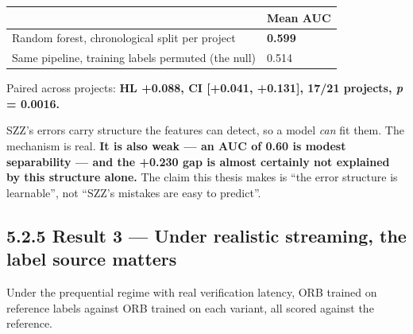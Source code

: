 \begin{longtable}[]{@{}ll@{}}
\toprule\noalign{}
& Mean AUC \\
\midrule\noalign{}
\endhead
\bottomrule\noalign{}
\endlastfoot
Random forest, chronological split per project & \textbf{0.599} \\
Same pipeline, training labels permuted (the null) & 0.514 \\
\end{longtable}

Paired across projects: \textbf{HL +0.088, CI {[}+0.041, +0.131{]},
17/21 projects, \emph{p} = 0.0016.}

SZZ's errors carry structure the features can detect, so a model
\emph{can} fit them. The mechanism is real. \textbf{It is also weak ---
an AUC of 0.60 is modest separability --- and the +0.230 gap is almost
certainly not explained by this structure alone.} The claim this thesis
makes is ``the error structure is learnable'', not ``SZZ's mistakes are
easy to predict''.

\subsection{5.2.5 Result 3 --- Under realistic streaming, the label
source
matters}\label{result-3-under-realistic-streaming-the-label-source-matters}

Under the prequential regime with real verification latency, ORB trained
on reference labels against ORB trained on each variant, all scored
against the reference.

